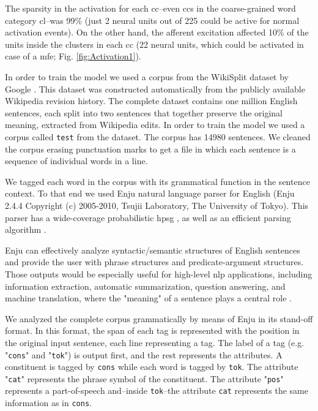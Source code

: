 {The sparsity in the activation for each \gls{cc}--even \glspl{cc} in the coarse-grained word category \gls{cl}--was 99\% (just 2 neural units out of 225 could be active for normal activation events). On the other hand, the afferent excitation affected 10\% of the units inside the clusters in each \gls{cc} (22 neural units, which could be activated in case of a \gls{mfe}; Fig. \ref{fig:Activation1}).

In order to train the model we used a corpus from the WikiSplit dataset by Google \cite{BothaEtAl2018}. This dataset was constructed automatically from the publicly available Wikipedia revision history. The complete dataset contains one million English sentences, each split into two sentences that together preserve the original meaning, extracted from Wikipedia edits. In order to train the model we used a corpus called \texttt{test} from the dataset. The corpus has 14980 sentences. We cleaned the corpus erasing punctuation marks to get a file in which each sentence is a sequence of individual words in a line.

We tagged each word in the corpus with its grammatical function in the sentence context.
To that end we used Enju natural language parser for English (Enju 2.4.4 Copyright (c) 2005-2010, Tsujii Laboratory, The University of Tokyo).
This parser has a wide-coverage probabilistic \gls{hpsg} \cite{Yusuke:2002:MEE:1289189.1289214, noauthor_2_nodate, Miyao2004CorpusOrientedGD, Miyao:2005:PDM:1219840.1219851, Ninomiya:2006:ELM:1610075.1610100, Ninomiya:2007:LMN:1621410.1621418, Miyao:2008:FFM:1350986.1350988}, as well as an efficient parsing algorithm \cite{tsuruoka:2004b, Ninomiya:2005:EBT:1654494.1654505, bc22fe91f8a743269f26f92abfd79790, Matsuzaki:2007:EHP:1625275.1625546}.

Enju can effectively analyze syntactic/semantic structures of English sentences and provide the user with phrase structures and predicate-argument structures. Those outputs would be especially useful for high-level \gls{nlp} applications, including information extraction, automatic summarization, question answering, and machine translation, where the "meaning" of a sentence plays a central role \cite{noauthor_english_2019}. 

We analyzed the complete corpus grammatically by means of Enju in its stand-off format. In this format, the span of each tag is represented with the position in the original input sentence, each line representing a tag.  The label of a tag (e.g. "\texttt{cons}" and "\texttt{tok}") is output first, and the rest represents the attributes. A constituent is tagged by \texttt{cons} while each word is tagged by \texttt{tok}. The attribute "\texttt{cat}" represents the phrase symbol of the constituent. The attribute "\texttt{pos}" represents a part-of-speech and--inside \texttt{tok}--the attribute \texttt{cat} represents the same information as in \texttt{cons}.

}
